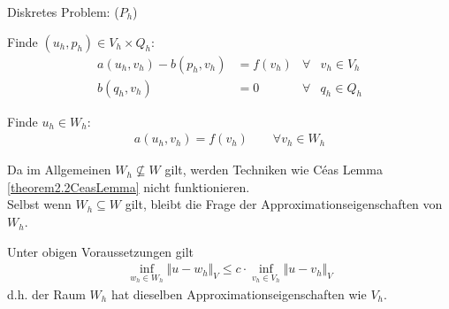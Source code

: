 Diskretes Problem: ($P_h$)\\
\begin{minipage}[t]{0.49\textwidth}
	Finde $(u_h,p_h)\in V_h\times Q_h$:
	\begin{align*}
		a(u_h,v_h)-b(p_h,v_h)&=f(v_h) &\forall&v_h\in V_h\\
		b(q_h,v_h)&=0 &\forall& q_h\in Q_h
	\end{align*}
\end{minipage} %
\begin{minipage}[t]{0.49\textwidth}
	Finde $u_h\in W_h$:
	\begin{align*}
		a(u_h,v_h)=f(v_h)\qquad\forall v_h\in W_h
	\end{align*}
\end{minipage}

\begin{bemerkung}
	Da im Allgemeinen $W_h\not\subseteq W$ gilt, werden Techniken wie Céas Lemma \ref{theorem2.2CeasLemma} nicht funktionieren.\\
	Selbst wenn $W_h\subseteq W$ gilt, bleibt die Frage der Approximationseigenschaften von $W_h$.
\end{bemerkung}

\begin{theorem} %
	Unter obigen Voraussetzungen gilt
	\begin{align*}
		\inf\limits_{w_h\in W_h}\big\Vert u-w_h\big\Vert_V\leq c\cdot\inf\limits_{v_h\in V_h}\big\Vert u-v_h\big\Vert_V
	\end{align*}
	d.h. der Raum $W_h$ hat dieselben Approximationseigenschaften wie $V_h$.
\end{theorem}

